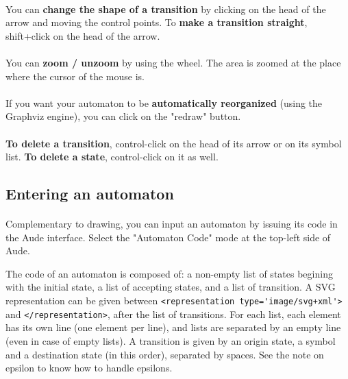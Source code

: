 \paragraph{}
You can {\bfseries change the shape of a transition} by clicking on the head of the arrow and moving the control points. To {\bfseries make a transition straight}, shift+click on the head of the arrow.

\paragraph{}
You can {\bfseries zoom / unzoom} by using the wheel. The area is zoomed at the place where the cursor of the mouse is.

\paragraph{}
If you want your automaton to be {\bfseries automatically reorganized} (using the Graphviz engine), you can click on the "redraw" button.

\paragraph{}
{\bfseries To delete a transition}, control-click on the head of its arrow or on its symbol list. {\bfseries To delete a state}, control-click on it as well.

\subsection{Entering an automaton}

\paragraph{}
Complementary to drawing, you can input an automaton by issuing its code in the Aude interface. Select the "Automaton Code" mode at the top-left side of Aude.

The code of an automaton is composed of: a non-empty list of states begining with the initial state, a list of accepting states, and a list of transition. A SVG representation can be given between \verb!<representation type='image/svg+xml'>! and \verb!</representation>!, after the list of transitions. For each list, each element has its own line (one element per line), and lists are separated by an empty line (even in case of empty lists). A transition is given by an origin state, a symbol and a destination state (in this order), separated by spaces. See the note on epsilon to know how to handle epsilons.

